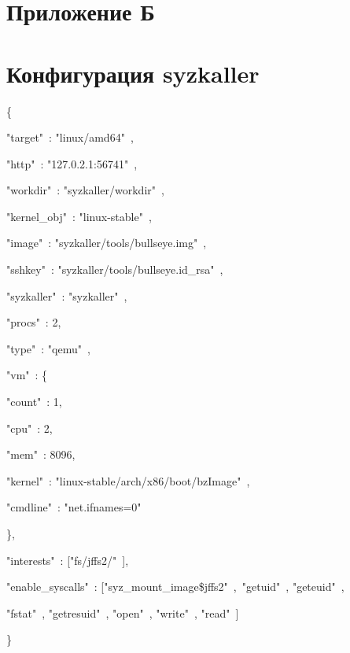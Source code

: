 \section*{Приложение Б}
\label{sec:Apendix} 

\section*{Конфигурация syzkaller}

\{

        "target"\ : "linux/amd64"\ ,

        "http"\ : "127.0.2.1:56741"\ ,

        "workdir"\ : "syzkaller/workdir"\ ,

        "kernel\_obj"\ : "linux-stable"\ ,

        "image"\ : "syzkaller/tools/bullseye.img"\ ,

        "sshkey"\ : "syzkaller/tools/bullseye.id\_rsa"\ ,

        "syzkaller"\ : "syzkaller"\ ,

        "procs"\ : 2,

        "type"\ : "qemu"\ ,

        "vm"\ : \{

                "count"\ : 1,

                "cpu"\ : 2,

                "mem"\ : 8096,

                "kernel"\ : "linux-stable/arch/x86/boot/bzImage"\ ,

                "cmdline"\ : "net.ifnames=0"\ 

        \},

        "interests"\ : ["fs/jffs2/"\ ],

        "enable\_syscalls"\ : ["syz\_mount\_image\$jffs2"\ ,\ "getuid"\ , "geteuid"\ , 

                "fstat"\ , "getresuid"\ , "open"\ , "write"\ , "read"\ ]

\}
